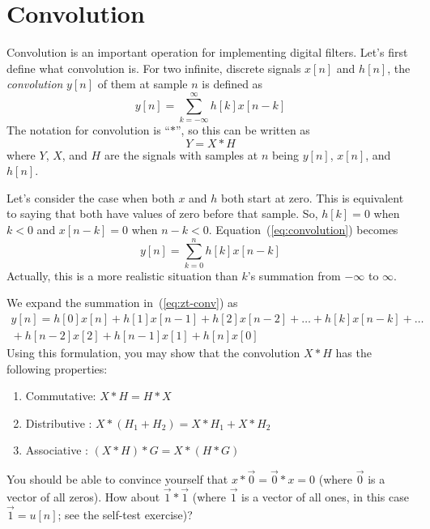 \section{Convolution}
\label{sc:convolution}

 Convolution is an important
operation for implementing digital filters.  Let's first define what
convolution is. For two infinite, discrete signals $x[n]$ and $h[n]$,
the \emph{convolution} $y[n]$ of them at sample $n$ is defined as
\begin{equation}
y[n] = \sum_{k=-\infty}^{\infty} h[k] x[n-k]
\label{eq:convolution}
\end{equation}
The notation for convolution is ``$\ast$'', so this can be written as 
\begin{equation}
Y = X \ast H
\end{equation}
where $Y$, $X$, and $H$ are the signals with samples at $n$ being
$y[n]$, $x[n]$, and $h[n]$.

Let's consider the case when both $x$ and $h$ both start at zero. This
is equivalent to saying that both have values of zero before that
sample. So, $h[k] = 0$ when $k<0$ and $x[n-k]=0$ when
$n-k<0$. Equation~(\ref{eq:convolution}) becomes
\begin{equation}
y[n] = \sum_{k=0}^{n} h[k] x[n-k]
\label{eq:zt-conv}
\end{equation}
Actually, this is a more realistic situation than $k$'s summation
from $-\infty$ to $\infty$.

We expand the summation in~(\ref{eq:zt-conv}) as
\begin{multline}
y[n] = h[0] x[n] + h[1] x[n-1] + h[2] x[n-2] + \ldots + h[k] x[n-k]
       + \ldots \\
       {}+ h[n-2] x[2] + h[n-1] x[1] + h[n] x[0]
\label{eq:zt-conv-exp}
\end{multline}
Using this formulation, you may show that the convolution $X \ast H$ has the
following properties:
\begin{enumerate}
\item Commutative: $X \ast H=H \ast X$
\item Distributive :  $X \ast (H_1 + H_2)=X \ast H_1 + X \ast H_2$
\item Associative : $(X \ast H) \ast G = X \ast (H \ast G)$
\end{enumerate}
You should be able to convince yourself that $x \ast \vec{0} = \vec{0}
\ast x = 0$ (where $\vec{0}$ is a vector of all zeros). How about
$\vec{1} \ast \vec{1}$ (where $\vec{1}$ is a vector of all ones, in
this case $\vec{1}=u[n]$; see the self-test exercise)?

